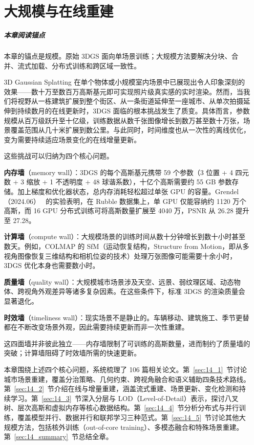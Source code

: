 \chapter{大规模与在线重建}
\label{ch:14}

\paragraph*{本章阅读锚点}
本章的锚点是规模。原始 3DGS 面向单场景训练；大规模方法要解决分块、合并、流式加载、分布式训练和跨区域一致性。


3D Gaussian Splatting 在单个物体或小规模室内场景中已展现出令人印象深刻的效果——数十万至数百万高斯基元即可实现照片级真实感的实时渲染。然而，当我们将视野从一栋建筑扩展到整个街区、从一条街道延伸至一座城市、从单次拍摄延伸到持续数月的在线更新时，3DGS 面临的根本挑战发生了质变。具体而言，参数规模从百万级跃升至十亿级，训练数据从数千张图像增长到数万甚至数十万张，场景覆盖范围从几十米扩展到数公里。与此同时，时间维度也从一次性的离线优化，变为需要持续适应场景变化的在线增量更新。

这些挑战可以归纳为四个核心问题。

\textbf{内存墙}（memory wall）：3DGS 的每个高斯基元携带 59 个参数（3 位置 + 4 四元数 + 3 缩放 + 1 不透明度 + 48 球谐系数），十亿个高斯需要约 55 GB 参数存储。加上梯度和优化器状态，总内存消耗轻松超过单张 GPU 的容量。Grendel（2024.06）~\cite{2406_18533} 的实验表明，在 Rubble 数据集上，单 GPU 仅能容纳约 1120 万个高斯，而 16 GPU 分布式训练可将高斯数量扩展至 4040 万，PSNR 从 26.28 提升至 27.28。

\textbf{计算墙}（compute wall）：大规模场景的训练时间从数十分钟增长到数十小时甚至数天。例如，COLMAP 的 SfM（运动恢复结构，Structure from Motion，即从多视角图像恢复三维结构和相机位姿的技术）处理万张图像可能需要十余小时，3DGS 优化本身也需要数小时。

\textbf{质量墙}（quality wall）：大规模城市场景涉及天空、远景、弱纹理区域、动态物体、跨视角外观差异等诸多复杂因素。在这些条件下，标准 3DGS 的渲染质量会显著退化。

\textbf{时效墙}（timeliness wall）：现实场景不是静止的。车辆移动、建筑施工、季节更替都在不断改变场景外观，因此需要持续更新而非一次性重建。

这四面墙并非彼此独立——内存墙限制了可训练的高斯数量，进而制约了质量墙的突破；计算墙阻碍了时效墙所需的快速更新。

本章围绕上述四个核心问题，系统梳理了 106 篇相关论文。第~\ref{sec:14_1}~节讨论城市场景重建，覆盖分治策略、几何约束、跨视角融合和语义辅助四条技术路线。第~\ref{sec:14_2}~节介绍在线与增量重建，涵盖流式重建、场景更新、变化检测和持续学习。第~\ref{sec:14_3}~节深入分层与 LOD（Level-of-Detail）表示，探讨八叉树、层次高斯和虚拟内存等核心数据结构。第~\ref{sec:14_4}~节分析分布式与并行训练，覆盖模型并行、数据并行和联邦学习三种范式。第~\ref{sec:14_5}~节讨论其他大规模方法，包括核外训练（out-of-core training）、多模态融合和特殊场景重建。第~\ref{sec:14_summary}~节总结全章。

